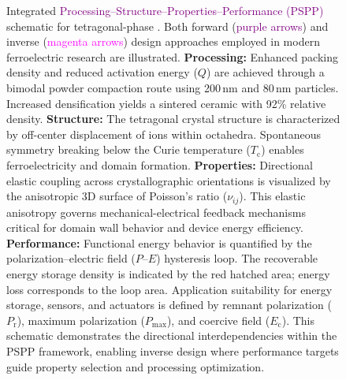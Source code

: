 \documentclass[a4paper,fleqn]{cas-sc}
\begin{document}
\begin{figure}
    \caption{Integrated \textcolor{purple}{Processing--Structure--Properties--Performance (PSPP)} schematic for tetragonal-phase . Both forward (\textcolor{purple}{purple arrows}) and inverse (\textcolor{magenta}{magenta arrows}) design approaches employed in modern ferroelectric research are illustrated. \textbf{Processing:} Enhanced packing density and reduced activation energy ($Q$) are achieved through a bimodal powder compaction route using 200\,nm and 80\,nm  particles. Increased densification yields a sintered ceramic with 92\% relative density. \textbf{Structure:} The tetragonal crystal structure is characterized by off-center displacement of  ions within  octahedra. Spontaneous symmetry breaking below the Curie temperature ($T_{\mathrm{c}}$) enables ferroelectricity and domain formation. \textbf{Properties:} Directional elastic coupling across crystallographic orientations is visualized by the anisotropic 3D surface of Poisson's ratio ($\nu_{ij}$). This elastic anisotropy governs mechanical-electrical feedback mechanisms critical for domain wall behavior and device energy efficiency. \textbf{Performance:} Functional energy behavior is quantified by the polarization--electric field ($P$--$E$) hysteresis loop. The recoverable energy storage density is indicated by the red hatched area; energy loss corresponds to the loop area. Application suitability for energy storage, sensors, and actuators is defined by remnant polarization ($P_{\mathrm{r}}$), maximum polarization ($P_{\mathrm{max}}$), and coercive field ($E_{\mathrm{c}}$). This schematic demonstrates the directional interdependencies within the PSPP framework, enabling inverse design where performance targets guide property selection and processing optimization.}
\label{fig:pspp}
\end{figure}


    
   

\end{document}
